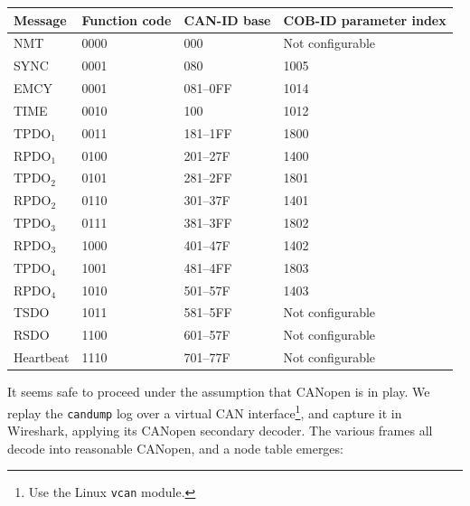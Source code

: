 \documentclass[letterpaper,10pt]{article}
\begin{document}
\begin{center}
\begin{tabular}[pos]{ | l | l | l | l | }
  \hline
Message	& Function code	& CAN-ID base & COB-ID parameter index \\
  \hline
NMT	& 0000 & 000 & Not configurable \\
SYNC & 0001	& 080 & 1005 \\
EMCY & 0001	& 081--0FF & 1014 \\
TIME & 0010	& 100 &	1012 \\
$\mathrm{TPDO_1}$ & 0011 &	181--1FF & 1800 \\
$\mathrm{RPDO_1}$ & 0100 & 201--27F & 1400 \\
$\mathrm{TPDO_2}$ & 0101 & 281--2FF & 1801 \\
$\mathrm{RPDO_2}$ & 0110 & 301--37F & 1401 \\
$\mathrm{TPDO_3}$ & 0111 & 381--3FF & 1802 \\
$\mathrm{RPDO_3}$ & 1000 & 401--47F & 1402 \\
$\mathrm{TPDO_4}$ & 1001 & 481--4FF & 1803 \\
$\mathrm{RPDO_4}$ & 1010 & 501--57F & 1403 \\
TSDO & 1011 & 581--5FF & Not configurable \\
RSDO & 1100 & 601--57F & Not configurable \\
Heartbeat	& 1110 &	701--77F & Not configurable \\
  \hline
\end{tabular}
\end{center}

It seems safe to proceed under the assumption that CANopen is in play. We
replay the \texttt{candump} log over a virtual CAN interface\footnote{Use the
Linux \texttt{vcan} module.}, and capture it in Wireshark\parencite{wireshark},
applying its CANopen secondary decoder. The various frames all decode into
reasonable CANopen, and a node table emerges:
\end{document}
